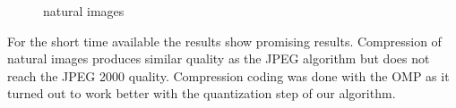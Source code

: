 \begin{figure}[h]
\centering

\hspace{5mm}
\hspace{5mm}
\hspace{5mm}
\caption{natural images}
\end{figure}

For the short time available the results show promising results. Compression of
natural images produces similar quality as the JPEG algorithm
 but does not reach the JPEG 2000 quality. 
Compression coding was done with the OMP as it turned out to work better with
the quantization step of our algorithm. 

